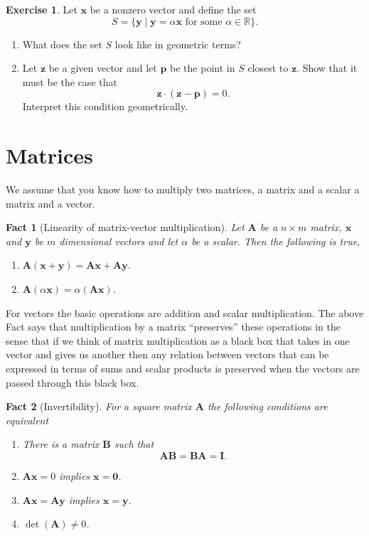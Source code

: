 \documentclass[11pt,reqno,openany]{amsbook}
\numberwithin{figure}{chapter}
\numberwithin{equation}{chapter}
\theoremstyle{plain}
\newtheorem{fact}{Fact}[chapter]
\theoremstyle{definition}
\newtheorem{xca}{Exercise}[chapter]
\renewcommand{\vec}[1]{\mathbf{#1}}
\newcommand{\mat}[1]{\mathbf{#1}}
\newcommand{\dotprod}[2]{{#1}\cdot{#2}}
\renewcommand{\Re}{\mathbb{R}}
\begin{document}
\begin{xca}
  Let $\vec{x}$ be a nonzero vector and define the set
  \[S = \{\vec{y} \mid \vec{y} = \alpha\vec{x} \text{ for some $\alpha
    \in \Re$}\}.\]
  \begin{enumerate}
    \item What does the set $S$ look like in geometric terms?
    \item Let $\vec{z}$ be a given vector and let $\vec{p}$ be the
      point in $S$ closest to $\vec{z}$. Show that it must be the case
      that
      \[\dotprod{\vec{z}}{(\vec{z}-\vec{p})}=0.\]
      Interpret this condition geometrically.
    \end{enumerate}
\end{xca}
\section{Matrices}
  We assume that you know how to multiply two matrices, a matrix and a
  scalar a matrix and a vector.
\begin{fact}[Linearity of matrix-vector multiplication]
  Let $\mat{A}$ be a $n \times m$ matrix, $\vec{x}$ and
  $\vec{y}$ be $m$ dimensional vectors and let $\alpha$ be a scalar.
  Then the following is true,
  \begin{enumerate}
    \item $\mat{A}(\vec{x}+\vec{y})=\mat{A}\vec{x} + \mat{A}\vec{y}$.
    \item $\mat{A}(\alpha\vec{x}) = \alpha (\mat{A}\vec{x})$.
  \end{enumerate}
\end{fact}

For vectors the basic operations are addition and scalar
multiplication. The above Fact says that multiplication by a matrix
``preserves'' these operations in the sense that if we think of matrix
multiplication as a black box that takes in one vector and gives us
another then any relation between vectors that can be expressed in
terms of sums and scalar products is preserved when the vectors are
passed through this black box.

\begin{fact}[Invertibility]
  For a square matrix $\mat{A}$ the following conditions are
  equivalent
  \begin{enumerate}
  \item There is a matrix $\mat{B}$ such that 
    \[\mat{A}\mat{B}=\mat{B}\mat{A}=\mat{I}.\]
  \item $\mat{A}\vec{x}=0$ implies $\vec{x}=\vec{0}$.
  \item $\mat{A}\vec{x}=\mat{A}\vec{y}$ implies $\vec{x}=\vec{y}$.
  \item $\det(\mat{A}) \ne 0$.
  \end{enumerate}
\end{fact}
\end{document}
